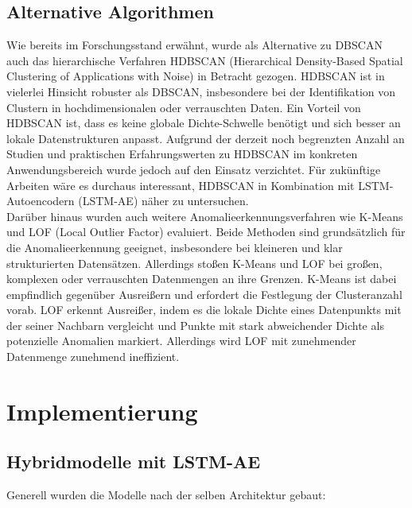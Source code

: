\documentclass[a4paper,12pt]{article}
\begin{document}
	\subsection{Alternative Algorithmen}
	Wie bereits im Forschungsstand erwähnt, wurde als Alternative zu DBSCAN auch das hierarchische Verfahren HDBSCAN (Hierarchical Density-Based Spatial Clustering of Applications with Noise) in Betracht gezogen. HDBSCAN ist in vielerlei Hinsicht robuster als DBSCAN, insbesondere bei der Identifikation von Clustern in hochdimensionalen oder verrauschten Daten. Ein Vorteil von HDBSCAN ist, dass es keine globale Dichte-Schwelle benötigt und sich besser an lokale Datenstrukturen anpasst. Aufgrund der derzeit noch begrenzten Anzahl an Studien und praktischen Erfahrungswerten zu HDBSCAN im konkreten Anwendungsbereich wurde jedoch auf den Einsatz verzichtet. Für zukünftige Arbeiten wäre es durchaus interessant, HDBSCAN in Kombination mit LSTM-Autoencodern (LSTM-AE) näher zu untersuchen.
	\\[0.5em]
	Darüber hinaus wurden auch weitere Anomalieerkennungsverfahren wie K-Means und LOF (Local Outlier Factor) evaluiert. Beide Methoden sind grundsätzlich für die Anomalieerkennung geeignet, insbesondere bei kleineren und klar strukturierten Datensätzen. Allerdings stoßen K-Means und LOF bei großen, komplexen oder verrauschten Datenmengen an ihre Grenzen. K-Means ist dabei empfindlich gegenüber Ausreißern und erfordert die Festlegung der Clusteranzahl vorab. LOF erkennt Ausreißer, indem es die lokale Dichte eines Datenpunkts mit der seiner Nachbarn vergleicht und Punkte mit stark abweichender Dichte als potenzielle Anomalien markiert. Allerdings wird LOF mit zunehmender Datenmenge zunehmend ineffizient.
	
	\section{Implementierung}
	\subsection{Hybridmodelle mit LSTM-AE}
	Generell wurden die Modelle nach der selben Architektur gebaut:
	
\end{document}
